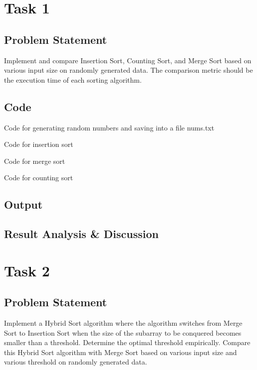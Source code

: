 \section{Task 1}
\subsection{Problem Statement}
Implement and compare Insertion Sort, Counting Sort, and Merge Sort based on
various input size on randomly generated data.  The comparison metric should be
the execution time of each sorting algorithm.
\subsection{Code}
\begin{code}
    \caption{Code for generating random numbers and saving into a file nums.txt}
    \label{code:random}
\end{code}

\begin{code}
    \caption{Code for insertion sort}
    \label{code:insertion}
\end{code}

\begin{code}
    \caption{Code for merge sort}
    \label{code:merge}
\end{code}

\begin{code}
    \caption{Code for counting sort}
    \label{code:counting}
\end{code}
\subsection{Output}
\subsection{Result Analysis \& Discussion}

\newpage
\section{Task 2}
\subsection{Problem Statement}
Implement a Hybrid Sort algorithm where the algorithm switches from Merge Sort
to Insertion Sort when the size of the subarray to be conquered becomes smaller
than a threshold. Determine the optimal threshold empirically. Compare this
Hybrid Sort algorithm with Merge Sort  based on various input size and various
threshold on randomly generated data.

